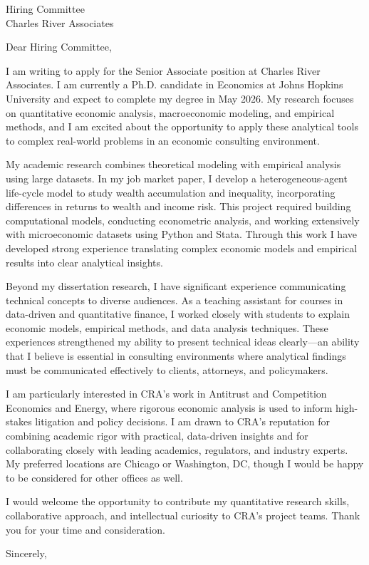 \documentclass[11pt]{letter}
\begin{document}
\begin{letter}{Hiring Committee \\
Charles River Associates}

\opening{Dear Hiring Committee,}

I am writing to apply for the Senior Associate position at Charles River Associates. I am currently a Ph.D. candidate in Economics at Johns Hopkins University and expect to complete my degree in May 2026. My research focuses on quantitative economic analysis, macroeconomic modeling, and empirical methods, and I am excited about the opportunity to apply these analytical tools to complex real-world problems in an economic consulting environment.

My academic research combines theoretical modeling with empirical analysis using large datasets. In my job market paper, I develop a heterogeneous-agent life-cycle model to study wealth accumulation and inequality, incorporating differences in returns to wealth and income risk. This project required building computational models, conducting econometric analysis, and working extensively with microeconomic datasets using Python and Stata. Through this work I have developed strong experience translating complex economic models and empirical results into clear analytical insights.

Beyond my dissertation research, I have significant experience communicating technical concepts to diverse audiences. As a teaching assistant for courses in data-driven and quantitative finance, I worked closely with students to explain economic models, empirical methods, and data analysis techniques. These experiences strengthened my ability to present technical ideas clearly—an ability that I believe is essential in consulting environments where analytical findings must be communicated effectively to clients, attorneys, and policymakers.

I am particularly interested in CRA’s work in Antitrust and Competition Economics and Energy, where rigorous economic analysis is used to inform high-stakes litigation and policy decisions. I am drawn to CRA’s reputation for combining academic rigor with practical, data-driven insights and for collaborating closely with leading academics, regulators, and industry experts. My preferred locations are Chicago or Washington, DC, though I would be happy to be considered for other offices as well.

I would welcome the opportunity to contribute my quantitative research skills, collaborative approach, and intellectual curiosity to CRA’s project teams. Thank you for your time and consideration.

\closing{Sincerely,}

\end{letter}
\end{document}
